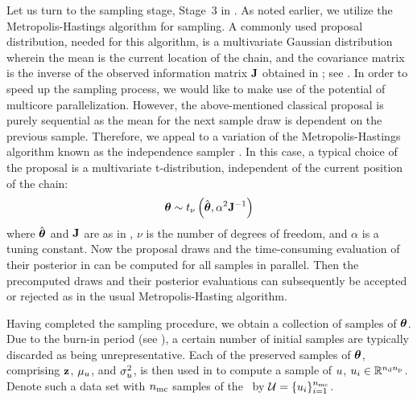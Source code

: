 Let us turn to the sampling stage, Stage~3 in . As noted earlier, we utilize the Metropolis-Hastings algorithm for sampling.
A commonly used proposal distribution, needed for this algorithm, is a multivariate Gaussian distribution wherein the mean is the current location of the chain, and the covariance matrix is the inverse of the observed information matrix $\mathbf{J}$ obtained in ; see \cite{gelman2004, bernardo2007}.
In order to speed up the sampling process, we would like to make use of the potential of multicore parallelization. However, the above-mentioned classical proposal is purely sequential as the mean for the next sample draw is dependent on the previous sample. Therefore, we appeal to a variation of the Metropolis-Hastings algorithm known as the independence sampler \cite{gelman2004}. In this case, a typical choice of the proposal is a multivariate t-distribution, independent of the current position of the chain:
\begin{equation} \elabel{proposal}
  \vparam \sim \studentst{\nu}{\hat{\vparam}}{\alpha^2 \mOI^{-1}}
\end{equation}
where $\hat{{\boldsymbol\theta}}$ and $\mathbf{J}$ are as in , $\nu$ is the number of degrees of freedom, and $\alpha$ is a tuning constant. Now the proposal draws and the time-consuming evaluation of their posterior in  can be computed for all samples in parallel.
Then the precomputed draws and their posterior evaluations can subsequently be accepted or rejected as in the usual Metropolis-Hasting algorithm.

Having completed the sampling procedure, we obtain a collection of samples of ${\boldsymbol\theta}$. Due to the burn-in period (see ), a certain number of initial samples are typically discarded as being unrepresentative.
Each of the preserved samples of ${\boldsymbol\theta}$, comprising $\mathbf{z}$, $\mu_u$, and $\sigma^2_u$, is then used in  to compute a sample of $u$, $u_i \in \mathbb{R}^{{n_\text{d}} {n_\text{p}}}$.
Denote such a data set with ${n_\text{mc}}$ samples of the \qoi\ by $\mathcal{U} = \{ u_i \}_{i = 1}^{n_\text{mc}}$.
